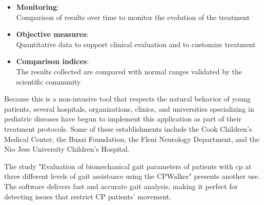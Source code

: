 \begin{itemize}
\item \textbf{Monitoring}: \\
Comparison of results over time to monitor the evolution of the treatment
\item \textbf{Objective measures}: \\
Quantitative data to support clinical evaluation and to customize treatment
\item \textbf{Comparison indices}: \\
The results collected are compared with normal ranges validated by the scientific community
\end{itemize}

Because this is a non-invasive tool that respects the natural behavior of young patients, several hospitals, organizations, clinics, and universities specializing in pediatric diseases have begun to implement this application as part of their treatment protocols. Some of these establishments include the Cook Children's Medical Center, the Buzzi Foundation, the Fleni Neurology Department, and the Nio Jess University Children's Hospital.

\bigskip

The study "Evaluation of biomechanical gait parameters of patients with \ac{cp} at three different levels of gait assistance using the CPWalker" presents another use. The software delivers fast and accurate gait analysis, making it perfect for detecting issues that restrict CP patients' movement.\cite{Aycardi2019}